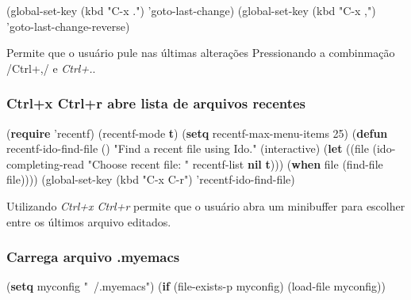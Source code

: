 \documentclass[]{article}
\newenvironment{Shaded}{}{}
\newcommand{\KeywordTok}[1]{\textcolor[rgb]{0.00,0.44,0.13}{\textbf{{#1}}}}
\newcommand{\DecValTok}[1]{\textcolor[rgb]{0.25,0.63,0.44}{{#1}}}
\newcommand{\StringTok}[1]{\textcolor[rgb]{0.25,0.44,0.63}{{#1}}}
\newcommand{\FunctionTok}[1]{\textcolor[rgb]{0.02,0.16,0.49}{{#1}}}
\newcommand{\NormalTok}[1]{{#1}}
\begin{document}
\begin{Shaded}
\begin{Highlighting}[]
\NormalTok{(global-set-key (kbd }\StringTok{"C-x ."}\NormalTok{) 'goto-last-change)}
\NormalTok{(global-set-key (kbd }\StringTok{"C-x ,"}\NormalTok{) 'goto-last-change-reverse)}
\end{Highlighting}
\end{Shaded}

Permite que o usuário pule nas últimas alterações Pressionando a
combinmação /Ctrl+,/ e \emph{Ctrl+.}.

\subsubsection{Ctrl+x Ctrl+r abre lista de arquivos
recentes}\label{ctrlx-ctrlr-abre-lista-de-arquivos-recentes}

\begin{Shaded}
\begin{Highlighting}[]
\NormalTok{(}\KeywordTok{require} \NormalTok{'recentf)}
\NormalTok{(recentf-mode }\KeywordTok{t}\NormalTok{)}
\NormalTok{(}\KeywordTok{setq} \NormalTok{recentf-max-menu-items }\DecValTok{25}\NormalTok{)}
\NormalTok{(}\KeywordTok{defun}\FunctionTok{ recentf-ido-find-file }\NormalTok{()}
  \StringTok{"Find a recent file using Ido."}
  \NormalTok{(interactive)}
  \NormalTok{(}\KeywordTok{let} \NormalTok{((file (ido-completing-read }\StringTok{"Choose recent file: "} \NormalTok{recentf-list }\KeywordTok{nil} \KeywordTok{t}\NormalTok{)))}
    \NormalTok{(}\KeywordTok{when} \NormalTok{file}
      \NormalTok{(find-file file))))}
\NormalTok{(global-set-key (kbd }\StringTok{"C-x C-r"}\NormalTok{) 'recentf-ido-find-file)}
\end{Highlighting}
\end{Shaded}

Utilizando \emph{Ctrl+x Ctrl+r} permite que o usuário abra um minibuffer
para escolher entre os últimos arquivo editados.

\subsubsection{Carrega arquivo .myemacs}\label{carrega-arquivo-.myemacs}

\begin{Shaded}
\begin{Highlighting}[]
\NormalTok{(}\KeywordTok{setq} \NormalTok{myconfig }\StringTok{"~/.myemacs"}\NormalTok{)}
\NormalTok{(}\KeywordTok{if} \NormalTok{(file-exists-p myconfig)}
    \NormalTok{(load-file myconfig))}
\end{Highlighting}
\end{Shaded}
\end{document}
